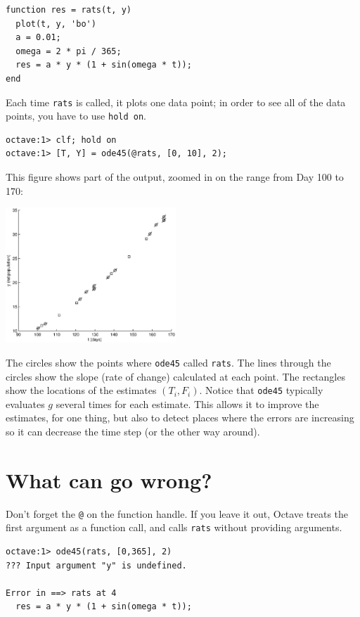 \documentclass{book}
\begin{document}
\begin{verbatim}
function res = rats(t, y)
  plot(t, y, 'bo')
  a = 0.01;
  omega = 2 * pi / 365;
  res = a * y * (1 + sin(omega * t));
end
\end{verbatim}

Each time {\tt rats} is called, it plots one data point; in order
to see all of the data points, you have to use {\tt hold on}.

\begin{verbatim}
octave:1> clf; hold on
octave:1> [T, Y] = ode45(@rats, [0, 10], 2);
\end{verbatim}

This figure shows part of the output, zoomed
in on the range from Day 100 to 170:

\beforefig \centerline{\includegraphics[height=2in]{figs/ode45.eps}}

The circles show the points where {\tt ode45} called {\tt rats}.
The lines through the circles show the slope (rate of change) calculated
at each point. The rectangles show the locations of the estimates
$(T_i, F_i)$. Notice that {\tt ode45} typically evaluates
$g$ several times for each estimate. This allows it to improve the
estimates, for one thing, but also to detect places where the errors
are increasing so it can decrease the time step (or the other
way around).


\section{What can go wrong?}

Don't forget the {\tt @} on the function handle.
If you leave it out, Octave treats the first argument as a function
call, and calls {\tt rats} without providing arguments.

\begin{verbatim}
octave:1> ode45(rats, [0,365], 2)
??? Input argument "y" is undefined.

Error in ==> rats at 4
  res = a * y * (1 + sin(omega * t));
\end{verbatim}
\end{document}
